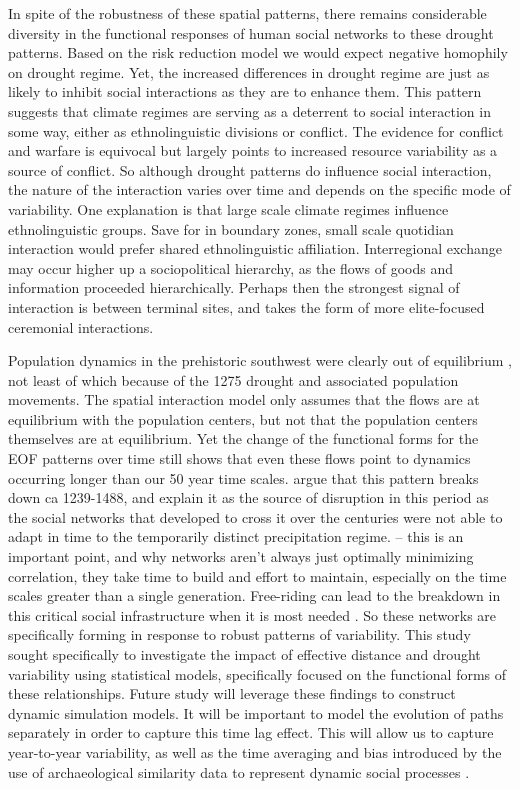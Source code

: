 \documentclass[10pt]{iopart}
\begin{document}
In spite of the robustness of these spatial patterns, there remains considerable diversity in the functional responses of human social networks to these drought patterns. Based on the risk reduction model we would expect negative homophily on drought regime. Yet, the increased differences in drought regime are just as likely to inhibit social interactions as they are to enhance them. This pattern suggests that climate regimes are serving as a deterrent to social interaction in some way, either as ethnolinguistic divisions or conflict. The evidence for conflict and warfare is equivocal \parencite{kohler2014, leblanc} but largely points to increased resource variability as a source of conflict. So although drought patterns do influence social interaction, the nature of the interaction varies over time and depends on the specific mode of variability. One explanation is that large scale climate regimes influence ethnolinguistic groups. Save for in boundary zones, small scale quotidian interaction would prefer shared ethnolinguistic affiliation. Interregional exchange may occur higher up a sociopolitical hierarchy, as the flows of goods and information proceeded hierarchically. Perhaps then the strongest signal of interaction is between terminal sites, and takes the form of more elite-focused ceremonial interactions.

Population dynamics in the prehistoric southwest were clearly out of equilibrium \parencite{Hill2004}, not least of which because of the 1275 drought and associated population movements. The spatial interaction model only assumes that the flows are at equilibrium with the population centers, but not that the population centers themselves are at equilibrium. Yet the change of the functional forms for the EOF patterns over time still shows that even these flows point to dynamics occurring longer than our 50 year time scales. \textcite{Cordell2007} argue that this pattern breaks down ca 1239-1488, and explain it as the source of disruption in this period as the social networks that developed to cross it over the centuries were not able to adapt in time to the temporarily distinct precipitation regime. -- this is an important point, and why networks aren't always just optimally minimizing correlation, they take time to build and effort to maintain, especially on the time scales greater than a single generation. Free-riding can lead to the breakdown in this critical social infrastructure when it is most needed \parencite{Kohler1996}. So these networks are specifically forming in response to robust patterns of variability. This study sought specifically to investigate the impact of effective distance and drought variability using statistical models, specifically focused on the functional forms of these relationships. Future study will leverage these findings to construct dynamic simulation models. It will be important to model the evolution of paths separately \parencite{Bevan2013} in order to capture this time lag effect. This will allow us to capture year-to-year variability, as well as the time averaging and bias introduced by the use of archaeological similarity data to represent dynamic social processes \parencite{Crema2014}.
\end{document}

